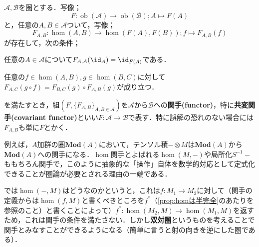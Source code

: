 \begin{defi}[関手]
	$\mathscr{A},\mathscr{B}$を圏とする．写像；
	\[F:\operatorname{ob}(\mathscr{A})\to\operatorname{ob}(\mathscr{B});A\mapsto F(A)\]
	と，任意の$A,B\in\mathscr{A}$ついて，写像；
	\[F_{A,B}:\hom(A,B)\to\hom(F(A),F(B));f\mapsto F_{A,B}(f)\]
	が存在して，次の条件；
	\begin{sakura}
		\item 任意の$A\in\mathscr{A}$について$F_{A,A}(\id_A)=\id_{F(A)}$である．
		\item 任意の$f\in\hom(A,B),g\in\hom(B,C)$に対して$F_{A,C}(g\circ f)=F_{B,C}(g)\circ F_{A,B}(g)$が成り立つ．
	\end{sakura}
	を満たすとき，組$(F,\{F_{A,B}\}_{A,B\in\mathscr{A}})$を$\mathscr{A}$から$\mathscr{B}$への\textbf{関手(functor)}，特に\textbf{共変関手(covariant functor)}といい$F:\mathscr{A}\to\mathscr{B}$で表す．特に誤解の恐れのない場合には$F_{A,B}$も単に$F$とかく．
\end{defi}

\begin{figure}[H]
	\centering
	\caption{}
\end{figure}
例えば，$A$加群の圏$\mathbf{Mod}(A)$において，テンソル積$-\otimes M$は$\mathbf{Mod}(A)$から$\mathbf{Mod}(A)$への関手になる．$\hom$関手とよばれる$\hom(M,-)$や局所化$S^{-1}-$ももちろん関手で，このように抽象的な「操作」自体を数学的対応として定式化できることが圏論が必要とされる理由の一端である．

では$\hom(-,M)$はどうなのかというと，これは$f:M_1\to M_2$に対して（関手の定義からは$\hom(f,M)$と書くべきところを$f^\ast$（\ref{prop:homは半完全}のあたりを参照のこと）と書くことによって）$f^\ast:\hom(M_2,M)\to\hom(M_1,M)$を返すため，これは関手の条件を満たさない．しかし\textbf{双対圏}というものを考えることで関手とみなすことができるようになる（簡単に言うと射の向きを逆にした圏である）．

